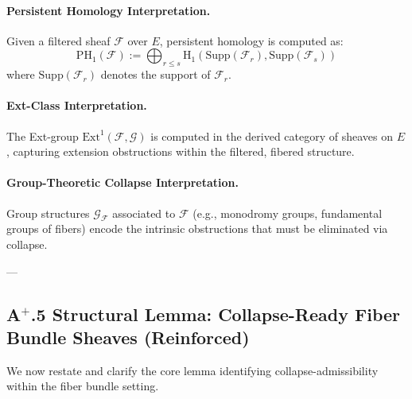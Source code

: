 \documentclass[11pt]{article}
\begin{document}
\paragraph{Persistent Homology Interpretation.}

Given a filtered sheaf $\mathcal{F}$ over $E$, persistent homology is computed as:
\[
\mathrm{PH}_1(\mathcal{F}) := \bigoplus_{r \leq s} \mathrm{H}_1\left( \mathrm{Supp}(\mathcal{F}_r), \mathrm{Supp}(\mathcal{F}_s) \right)
\]
where $\mathrm{Supp}(\mathcal{F}_r)$ denotes the support of $\mathcal{F}_r$.

\paragraph{Ext-Class Interpretation.}

The Ext-group $\mathrm{Ext}^1(\mathcal{F}, \mathcal{G})$ is computed in the derived category of sheaves on $E$, capturing extension obstructions within the filtered, fibered structure.

\paragraph{Group-Theoretic Collapse Interpretation.}

Group structures $\mathcal{G}_{\mathcal{F}}$ associated to $\mathcal{F}$ (e.g., monodromy groups, fundamental groups of fibers) encode the intrinsic obstructions that must be eliminated via collapse.

---

\subsection*{A$^{+}$.5 Structural Lemma: Collapse-Ready Fiber Bundle Sheaves (Reinforced)}

We now restate and clarify the core lemma identifying collapse-admissibility within the fiber bundle setting.
\end{document}
